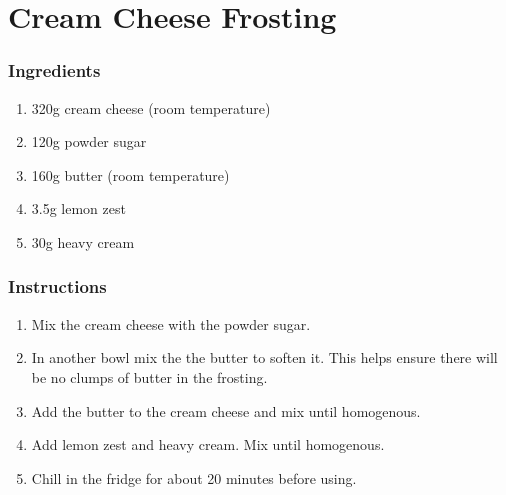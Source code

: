 \documentclass[11pt]{report}
\newcommand{\header}[1]{\subsubsection*{#1}}
\begin{document}
\section{Cream Cheese Frosting}

\header{Ingredients}
\begin{enumerate}
  \item 320g cream cheese (room temperature)
  \item 120g powder sugar
  \item 160g butter (room temperature)
  \item 3.5g lemon zest
  \item 30g heavy cream
\end{enumerate}

\header{Instructions}
\begin{enumerate}
 \item Mix the cream cheese with the powder sugar.
 \item In another bowl mix the the butter to soften it. This helps ensure there
 will be no clumps of butter in the frosting.
 \item Add the butter to the cream cheese and mix until homogenous.
 \item Add lemon zest and heavy cream. Mix until homogenous.
 \item Chill in the fridge for about 20 minutes before using.
\end{enumerate}
\end{document}
